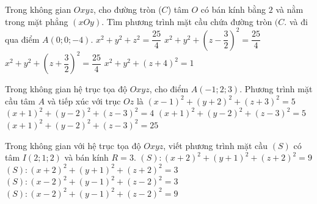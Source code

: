 \begin{ex}%
	Trong  không gian $Oxyz$, cho đường tròn ($C$) tâm $O$ có bán kính bằng $2$ và nằm trong mặt phẳng $(xOy)$. Tìm phương trình mặt cầu chứa đường tròn $(C.$ và đi qua điểm $A(0; 0;-4)$.
	\choice 
		{$x^2+y^2+z^2=\dfrac{25}{4}$} 
		{$x^2+y^2+\left(z-\dfrac{3}{2}\right)^2=\dfrac{25}{4}$} 
		{\True $x^2+y^2+\left(z+\dfrac{3}{2}\right)^2=\dfrac{25}{4}$} 
		{$x^2+y^2+(z+4)^2=1$} 
\end{ex}

\begin{ex}%
	Trong không gian hệ trục tọa độ $Oxyz$,  cho điểm $A\left(-1;2;3\right)$. Phương trình mặt cầu tâm $A$ và tiếp xúc với trục $Oz$ là
	\choice 
		 {$\left(x-1\right)^2+\left(y+2\right)^2+\left(z+3\right)^2=5$}
		 {$\left(x+1\right)^2+\left(y-2\right)^2+\left(z-3\right)^2=4$}
		 {\True $\left(x+1\right)^2+\left(y-2\right)^2+\left(z-3\right)^2=5$}
		{$\left(x+1\right)^2+\left(y-2\right)^2+\left(z-3\right)^2=25$} 
\end{ex}

\begin{ex}%
	Trong không gian với hệ trục tọa độ  $Oxyz$, viết phương trình mặt cầu $(S)$ có tâm $I\left(2;1;2\right)$ và bán kính $R=3$.
	 \choice
		{$(S)\colon{\left(x+2\right)^2}+\left(y+1\right)^2+\left(z+2\right)^2=9$} 
		 {$(S)\colon{\left(x+2\right)^2}+\left(y+1\right)^2+\left(z+2\right)^2=3$}
		 {$(S)\colon{\left(x-2\right)^2}+\left(y-1\right)^2+\left(z-2\right)^2=3$}
		{\True  $(S)\colon{\left(x-2\right)^2}+\left(y-1\right)^2+\left(z-2\right)^2=9$}
\end{ex}

